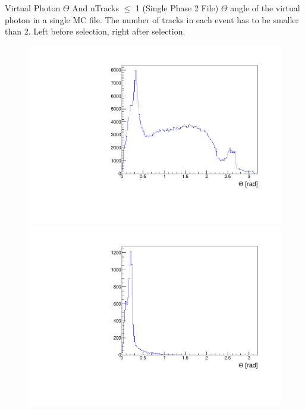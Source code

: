 \documentclass[10pt]{beamer}
\begin{document}
\begin{frame}{Virtual Photon $\Theta$ And nTracks $\leq$ 1 (Single Phase 2 File)}
	$\Theta$ angle of the virtual photon in a single MC file. The number of tracks in each event has to be smaller than 2. Left before selection, right after selection.
	
	\begin{figure}
		\centering
		\begin{minipage}{.5\textwidth}
			\centering
			\includegraphics[width=\textwidth]{gg/data/Thetagg_BS_nT1}
			
		\end{minipage}%
		\begin{minipage}{.5\textwidth}
			\centering
			\includegraphics[width=\textwidth]{gg/data/Thetagg_AS_nT1}
			
		\end{minipage}
	\end{figure}
	
	
	
\end{frame}
\end{document}
